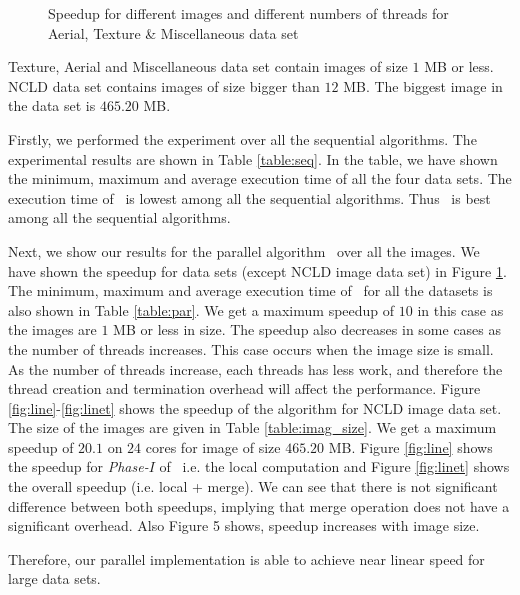 %
\begin{figure}[h]
\centering
{}
\caption{Speedup for different images and different numbers of threads for
Aerial, Texture \& Miscellaneous data set}
\label{fig:bar}
\end{figure}
Texture, Aerial and Miscellaneous data set contain images of size $1$ MB or less.
NCLD data set contains images of size bigger than $12$ MB. The biggest image in the data set is $465.20$ MB.

Firstly, we performed the experiment over all the sequential algorithms. The
experimental results are shown in Table \ref{table:seq}. In the table, we have
shown the minimum, maximum and average execution time of all the four data sets.
The execution time of \aremsp\ is lowest among all
the sequential algorithms. Thus \aremsp\ is best among all the sequential
algorithms.

Next, we show our results for the parallel algorithm \paremsp\ over all the images.
We have shown the speedup for data sets (except NCLD image data set) in Figure \ref{fig:bar}.
The minimum, maximum and average execution time of \paremsp\ for all the datasets is also shown in Table \ref{table:par}.
We get a maximum speedup of $10$ in this case as the images are $1$ MB or less in size. The speedup also decreases in some cases as the
number of threads increases.
This case occurs when the image size is small. As the number of threads increase, each threads has less work, and therefore the thread creation and termination overhead will affect the performance.
Figure \ref{fig:line}-\ref{fig:linet} shows the speedup of the algorithm for 
NCLD image data set. The size of the images are given in Table \ref{table:imag_size}.
We get a maximum speedup of $20.1$ on $24$ cores for image of size $465.20$ MB.
Figure \ref{fig:line} shows the speedup for {\em Phase-$I$} of \paremsp\ i.e. 
the local computation and Figure \ref{fig:linet} shows the overall speedup (i.e.
local + merge). We can see that there is not significant difference between both speedups, implying that merge operation
does not have a significant overhead. 
Also Figure 5 shows, speedup increases with image size.

Therefore, our parallel implementation is able to achieve near linear
speed for large data sets.





 

